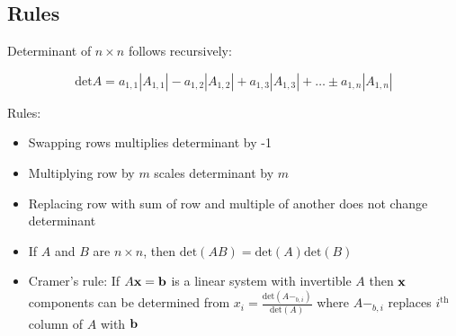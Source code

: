 \subsection{Rules}

Determinant of $n\times n$ follows recursively:

\[\boxed{\mbox{det}A=a_{1,1}\left|A_{1,1}\right|-a_{1,2}\left|A_{1,2}\right|+a_{1,3}\left|A_{1,3}\right|+\dots\pm a_{1,n}\left|A_{1,n}\right|}\]

\noindent
Rules:
\begin{itemize}
    \item Swapping rows multiplies determinant by -1
    \item Multiplying row by $m$ scales determinant by $m$
    \item Replacing row with sum of row and multiple of another does not change determinant
    \item If $A$ and $B$ are $n\times n$, then $\mathrm{det}(AB)=\mathrm{det}(A)\mathrm{det}(B)$
    \item Cramer's rule: If $A\textbf{x}=\textbf{b}$ is a linear system with invertible $A$ then $\textbf{x}$ components can be determined
    from $x_i=\frac{\mathrm{det}(A-_{b,i})}{\mathrm{det}(A)}$ where $A-_{b,i}$ replaces $i^{\mathrm{th}}$ column of $A$ with $\textbf{b}$
\end{itemize}